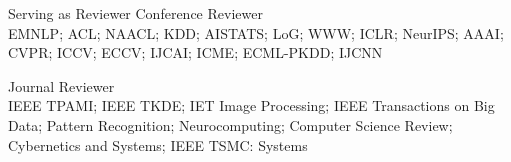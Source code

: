 \begin{rSection}{Serving as Reviewer}
Conference Reviewer\\
EMNLP; ACL; NAACL; KDD; AISTATS; LoG; WWW; ICLR; NeurIPS; AAAI; CVPR; ICCV; ECCV; IJCAI; ICME; ECML-PKDD; IJCNN

Journal Reviewer\\
IEEE TPAMI; IEEE TKDE; IET Image Processing; IEEE Transactions on Big Data; Pattern Recognition; Neurocomputing; Computer Science Review; Cybernetics and Systems; IEEE TSMC: Systems

\end{rSection}
